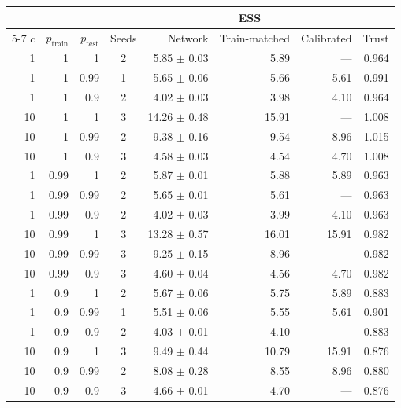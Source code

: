\begin{tabular}{rrrcrrrr}
\toprule
& & & & \multicolumn{3}{c}{ESS} & \\
\cmidrule(lr){5-7}
$c$ & $p_{\mathrm{train}}$ & $p_{\mathrm{test}}$ & Seeds & Network & Train-matched & Calibrated & Trust \\
\midrule
1 & 1 & 1 & 2 & 5.85 $\pm$ 0.03 & 5.89 & --- & 0.964 \\
1 & 1 & 0.99 & 1 & 5.65 $\pm$ 0.06 & 5.66 & 5.61 & 0.991 \\
1 & 1 & 0.9 & 2 & 4.02 $\pm$ 0.03 & 3.98 & 4.10 & 0.964 \\
10 & 1 & 1 & 3 & 14.26 $\pm$ 0.48 & 15.91 & --- & 1.008 \\
10 & 1 & 0.99 & 2 & 9.38 $\pm$ 0.16 & 9.54 & 8.96 & 1.015 \\
10 & 1 & 0.9 & 3 & 4.58 $\pm$ 0.03 & 4.54 & 4.70 & 1.008 \\
\midrule
1 & 0.99 & 1 & 2 & 5.87 $\pm$ 0.01 & 5.88 & 5.89 & 0.963 \\
1 & 0.99 & 0.99 & 2 & 5.65 $\pm$ 0.01 & 5.61 & --- & 0.963 \\
1 & 0.99 & 0.9 & 2 & 4.02 $\pm$ 0.03 & 3.99 & 4.10 & 0.963 \\
10 & 0.99 & 1 & 3 & 13.28 $\pm$ 0.57 & 16.01 & 15.91 & 0.982 \\
10 & 0.99 & 0.99 & 3 & 9.25 $\pm$ 0.15 & 8.96 & --- & 0.982 \\
10 & 0.99 & 0.9 & 3 & 4.60 $\pm$ 0.04 & 4.56 & 4.70 & 0.982 \\
\midrule
1 & 0.9 & 1 & 2 & 5.67 $\pm$ 0.06 & 5.75 & 5.89 & 0.883 \\
1 & 0.9 & 0.99 & 1 & 5.51 $\pm$ 0.06 & 5.55 & 5.61 & 0.901 \\
1 & 0.9 & 0.9 & 2 & 4.03 $\pm$ 0.01 & 4.10 & --- & 0.883 \\
10 & 0.9 & 1 & 3 & 9.49 $\pm$ 0.44 & 10.79 & 15.91 & 0.876 \\
10 & 0.9 & 0.99 & 2 & 8.08 $\pm$ 0.28 & 8.55 & 8.96 & 0.880 \\
10 & 0.9 & 0.9 & 3 & 4.66 $\pm$ 0.01 & 4.70 & --- & 0.876 \\
\bottomrule
\end{tabular}

